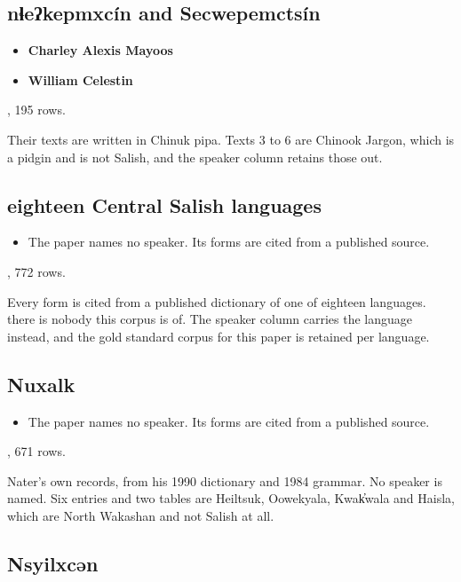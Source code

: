 \subsection{nɬeʔkepmxcín and Secwepemctsín}

\begin{itemize}
\item \textbf{Charley Alexis Mayoos}
\item \textbf{William Celestin}
\end{itemize}

\cite{src:Robertson-2012}, 195 rows.

Their texts are written in Chinuk pipa. Texts 3 to 6 are Chinook Jargon, which is a pidgin and is not Salish, and the speaker column retains those out.

\subsection{eighteen Central Salish languages}

\begin{itemize}
\item The paper names no speaker. Its forms are cited from a published source.
\end{itemize}

\cite{src:Wolfe-2025}, 772 rows.

Every form is cited from a published dictionary of one of eighteen languages. there is nobody this corpus is of. The speaker column carries the language instead, and the gold standard corpus for this paper is retained per language.

\subsection{Nuxalk}

\begin{itemize}
\item The paper names no speaker. Its forms are cited from a published source.
\end{itemize}

\cite{src:Nater-2024}, 671 rows.

Nater's own records, from his 1990 dictionary and 1984 grammar. No speaker is named. Six entries and two tables are Heiltsuk, Oowekyala, Kwak̓wala and Haisla, which are North Wakashan and not Salish at all.

\subsection{Nsyilxcən}

